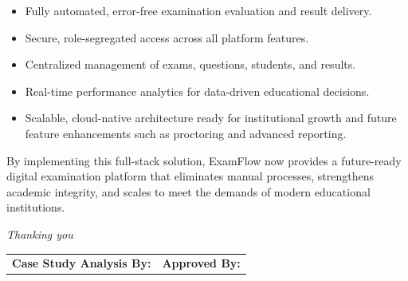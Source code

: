 \documentclass[12pt,a4paper]{article}
\begin{document}
\begin{itemize}[leftmargin=1.5em]
  \item Fully automated, error-free examination evaluation and result delivery.
  \item Secure, role-segregated access across all platform features.
  \item Centralized management of exams, questions, students, and results.
  \item Real-time performance analytics for data-driven educational decisions.
  \item Scalable, cloud-native architecture ready for institutional growth and future feature enhancements such as proctoring and advanced reporting.
\end{itemize}

\begin{notebox}
By implementing this full-stack solution, ExamFlow now provides a future-ready digital examination platform that eliminates manual processes, strengthens academic integrity, and scales to meet the demands of modern educational institutions.
\end{notebox}

\vspace{2cm}
\noindent\textit{Thanking you}

\vspace{1.5cm}
\noindent\begin{tabular}{p{7cm} p{7cm}}
  \textbf{Case Study Analysis By:} \hrulefill & \textbf{Approved By:} \hrulefill \\
\end{tabular}
\end{document}
